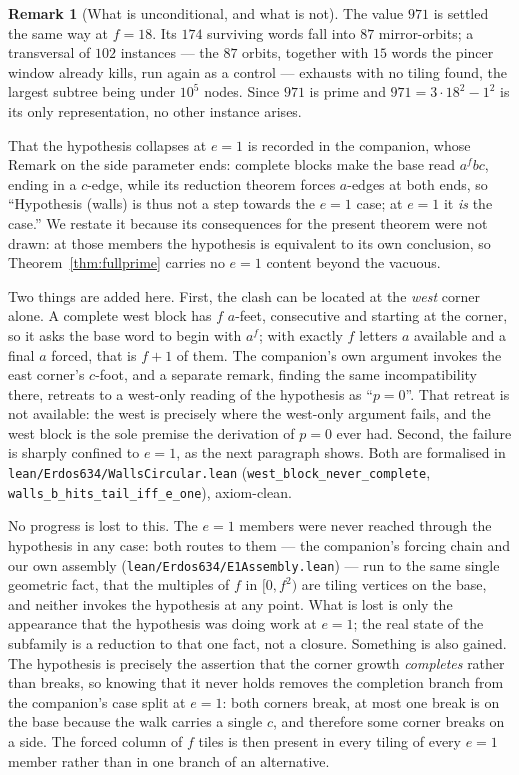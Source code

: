 \documentclass[11pt,reqno]{amsart}
\theoremstyle{plain}
\theoremstyle{definition}
\newtheorem{remark}[theorem]{Remark}
\begin{document}
\begin{remark}[What is unconditional, and what is not]
The value $971$ is settled the same way at $f=18$.  Its $174$ surviving words fall into $87$
mirror-orbits; a transversal of $102$ instances --- the $87$ orbits, together with $15$ words the
pincer window already kills, run again as a control --- exhausts with no tiling found, the largest
subtree being under $10^{5}$ nodes.  Since $971$ is prime and $971=3\cdot18^{2}-1^{2}$ is its only
representation, no other instance arises.

That the hypothesis collapses at $e=1$ is recorded in the companion, whose Remark on the side
parameter ends: complete blocks make the base read $a^fbc$, ending in a $c$-edge, while its
reduction theorem forces $a$-edges at both ends, so ``Hypothesis (walls) is thus not a step towards
the $e=1$ case; at $e=1$ it \emph{is} the case.'' We restate it because its consequences for the
present theorem were not drawn: at those members the hypothesis is equivalent to its own conclusion,
so Theorem~\ref{thm:fullprime} carries no $e=1$ content beyond the vacuous.

Two things are added here. First, the clash can be located at the \emph{west} corner alone. A
complete west block has $f$ $a$-feet, consecutive and starting at the corner, so it asks the base
word to begin with $a^f$; with exactly $f$ letters $a$ available and a final $a$ forced, that is
$f+1$ of them. The companion's own argument invokes the east corner's $c$-foot, and a separate
remark, finding the same incompatibility there, retreats to a west-only reading of the hypothesis as
``$p=0$''. That retreat is not available: the west is precisely where the west-only argument fails,
and the west block is the sole premise the derivation of $p=0$ ever had. Second, the failure is
sharply confined to $e=1$, as the next paragraph shows. Both are formalised in
\texttt{lean/Erdos634/WallsCircular.lean} (\texttt{west\_block\_never\_complete},
\texttt{walls\_b\_hits\_tail\_iff\_e\_one}), axiom-clean.

No progress is lost to this. The $e=1$ members were never reached through the hypothesis in any
case: both routes to them --- the companion's forcing chain and our own assembly
(\texttt{lean/Erdos634/E1Assembly.lean}) --- run to the same single geometric fact, that the
multiples of $f$ in $[0,f^2)$ are tiling vertices on the base, and neither invokes the hypothesis at
any point. What is lost is only the appearance that the hypothesis was doing work at $e=1$; the real
state of the subfamily is a reduction to that one fact, not a closure. Something is also gained.
The hypothesis is precisely the assertion that the corner growth \emph{completes} rather than
breaks, so knowing that it never holds removes the completion branch from the companion's case split
at $e=1$: both corners break, at most one break is on the base because the walk carries a single
$c$, and therefore some corner breaks on a side. The forced column of $f$ tiles is then present in
every tiling of every $e=1$ member rather than in one branch of an alternative.


\end{remark}
\end{document}

